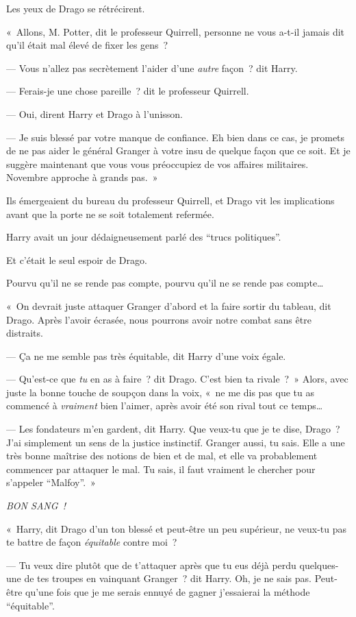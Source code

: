 Les yeux de Drago se rétrécirent.

«~Allons, M. Potter, dit le professeur Quirrell, personne ne vous a-t-il jamais dit qu'il était mal élevé de fixer les gens~?

--- Vous n'allez pas secrètement l'aider d'une \emph{autre} façon~? dit Harry.

--- Ferais-je une chose pareille~? dit le professeur Quirrell.

--- Oui, dirent Harry et Drago à l'unisson.

--- Je suis blessé par votre manque de confiance.
Eh bien dans ce cas, je promets de ne pas aider le général Granger à votre insu de quelque façon que ce soit.
Et je suggère maintenant que vous vous préoccupiez de vos affaires militaires.
Novembre approche à grands pas.~»

\later

Ils émergeaient du bureau du professeur Quirrell, et Drago vit les implications avant que la porte ne se soit totalement refermée.

Harry avait un jour dédaigneusement parlé des “trucs politiques”.

Et c'était le seul espoir de Drago.

Pourvu qu'il ne se rende pas compte, pourvu qu'il ne se rende pas compte…

«~On devrait juste attaquer Granger d'abord et la faire sortir du tableau, dit Drago.
Après l'avoir écrasée, nous pourrons avoir notre combat sans être distraits.

--- Ça ne me semble pas très équitable, dit Harry d'une voix égale.

--- Qu'est-ce que \emph{tu} en as à faire~? dit Drago.
C'est bien ta rivale~?~»
Alors, avec juste la bonne touche de soupçon dans la voix, «~ne me dis pas que tu as commencé à \emph{vraiment} bien l'aimer, après avoir été son rival tout ce temps…

--- Les fondateurs m'en gardent, dit Harry.
Que veux-tu que je te dise, Drago~?
J'ai simplement un sens de la justice instinctif.
Granger aussi, tu sais.
Elle a une très bonne maîtrise des notions de bien et de mal, et elle va probablement commencer par attaquer le mal.
Tu sais, il faut vraiment le chercher pour s'appeler “Malfoy”.~»

\emph{BON SANG~!}

«~Harry, dit Drago d'un ton blessé et peut-être un peu supérieur, ne veux-tu pas te battre de façon \emph{équitable} contre moi~?

--- Tu veux dire plutôt que de t'attaquer après que tu eus déjà perdu quelques-une de tes troupes en vainquant Granger~? dit Harry.
Oh, je ne sais pas.
Peut-être qu'une fois que je me serais ennuyé de gagner j'essaierai la méthode “équitable”.

